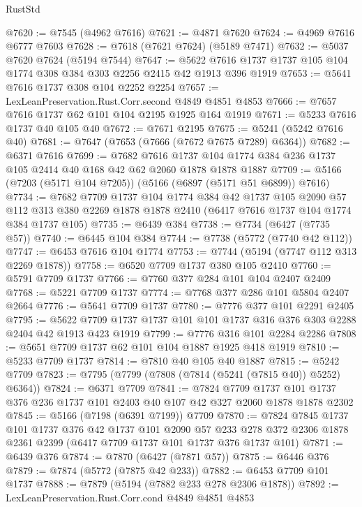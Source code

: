 \begin{lexlean}{RustStd}
\begin{coremodule}
{\begin{coremodule}
{{{{{{{{{{{{{{{{{{{{{{{{{{{{{@7620 := @7545 (@4962 @7616)
@7621 := @4871 @7620
@7624 := @4969 @7616 @6777 @7603
@7628 := @7618 (@7621 @7624) (@5189 @7471)
@7632 := @5037 @7620 @7624 (@5194 @7544)
@7647 := @5622 @7616 @1737 @1737 @105 @104 @1774 @308 @384 @303 @2256 @2415 @42 @1913 @396 @1919
@7653 := @5641 @7616 @1737 @308 @104 @2252 @2254
@7657 := LexLeanPreservation.Rust.Corr.second @4849 @4851 @4853
@7666 := @7657 @7616 @1737 @62 @101 @104 @2195 @1925 @164 @1919
@7671 := @5233 @7616 @1737 @40 @105 @40
@7672 := @7671 @2195
@7675 := @5241 (@5242 @7616 @40)
@7681 := @7647 (@7653 (@7666 (@7672 @7675 @7289) @6364))
@7682 := @6371 @7616
@7699 := @7682
    @7616
    @1737
    @104
    @1774
    @384
    @236
    @1737
    @105
    @2414
    @40
    @168
    @42
    @62
    @2060
    @1878
    @1878
    @1887
@7709 := @5166 (@7203 (@5171 @104 @7205)) (@5166 (@6897 (@5171 @51 @6899)) @7616)
@7734 := @7682
    @7709
    @1737
    @104
    @1774
    @384
    @42
    @1737
    @105
    @2090
    @57
    @112
    @313
    @380
    @2269
    @1878
    @1878
    @2410
    (@6417 @7616 @1737 @104 @1774 @384 @1737 @105)
@7735 := @6439 @384
@7738 := @7734 (@6427 (@7735 @57))
@7740 := @6445 @104 @384
@7744 := @7738 (@5772 (@7740 @42 @112))
@7747 := @6453 @7616 @104 @1774
@7753 := @7744 (@5194 (@7747 @112 @313 @2269 @1878))
@7758 := @6520 @7709 @1737 @380 @105 @2410
@7760 := @5791 @7709 @1737
@7766 := @7760 @377 @284 @101 @104 @2407 @2409
@7768 := @5221 @7709 @1737
@7774 := @7768 @377 @286 @101 @5804 @2407 @2664
@7776 := @5641 @7709 @1737
@7780 := @7776 @377 @101 @2291 @2405
@7795 := @5622 @7709 @1737 @1737 @101 @101 @1737 @316 @376 @303 @2288 @2404 @42 @1913 @423 @1919
@7799 := @7776 @316 @101 @2284 @2286
@7808 := @5651 @7709 @1737 @62 @101 @104 @1887 @1925 @418 @1919
@7810 := @5233 @7709 @1737
@7814 := @7810 @40 @105 @40 @1887
@7815 := @5242 @7709
@7823 := @7795 (@7799 (@7808 (@7814 (@5241 (@7815 @40)) @5252) @6364))
@7824 := @6371 @7709
@7841 := @7824
    @7709
    @1737
    @101
    @1737
    @376
    @236
    @1737
    @101
    @2403
    @40
    @107
    @42
    @327
    @2060
    @1878
    @1878
    @2302
@7845 := @5166 (@7198 (@6391 @7199)) @7709
@7870 := @7824
    @7845
    @1737
    @101
    @1737
    @376
    @42
    @1737
    @101
    @2090
    @57
    @233
    @278
    @372
    @2306
    @1878
    @2361
    @2399
    (@6417 @7709 @1737 @101 @1737 @376 @1737 @101)
@7871 := @6439 @376
@7874 := @7870 (@6427 (@7871 @57))
@7875 := @6446 @376
@7879 := @7874 (@5772 (@7875 @42 @233))
@7882 := @6453 @7709 @101 @1737
@7888 := @7879 (@5194 (@7882 @233 @278 @2306 @1878))
@7892 := LexLeanPreservation.Rust.Corr.cond @4849 @4851 @4853
}}}}}}}}}}}}}}}}}}}}}}}}}}}}}
\end{coremodule}}
\end{coremodule}
\end{lexlean}
